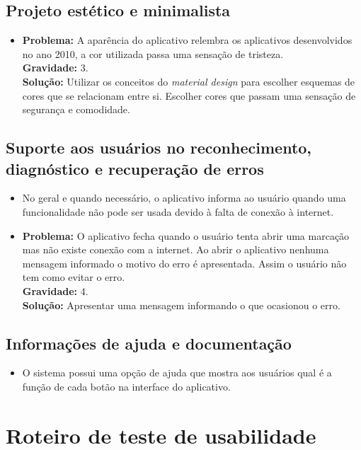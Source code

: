 \documentclass[a4paper,12pt,twoside]{report}
\begin{document}
\section{Projeto estético e minimalista}
\begin{itemize}
\item \textbf{Problema:} A aparência do aplicativo relembra os aplicativos desenvolvidos no ano 2010, a cor utilizada passa uma sensação de tristeza.\\
  \textbf{Gravidade:} 3.\\
  \textbf{Solução:} Utilizar os conceitos do \textit{material design}\cite{R3} para escolher
  esquemas de cores que se relacionam entre si. Escolher cores que passam uma
  sensação de segurança e comodidade.
\end{itemize}

\section{Suporte aos usuários no reconhecimento, diagnóstico e recuperação de erros}
\begin{itemize}
\item No geral e quando necessário, o aplicativo informa ao usuário quando uma
  funcionalidade não pode ser usada devido à falta de conexão à internet.
\item \textbf{Problema:} O aplicativo fecha quando o usuário tenta abrir uma marcação
  mas não existe conexão com a internet. Ao abrir o aplicativo
  nenhuma mensagem informado o motivo do erro é apresentada. Assim o
  usuário não tem como evitar o erro.\\
\textbf{Gravidade:} 4.\\
\textbf{Solução:} Apresentar uma mensagem informando o que ocasionou o erro.
\end{itemize}

\section{Informações de ajuda e documentação}
\begin{itemize}
\item O sistema possui uma opção de ajuda que mostra aos usuários qual é a função de
cada botão na interface do aplicativo.
\end{itemize}

\chapter{Roteiro de teste de usabilidade}
\end{document}
